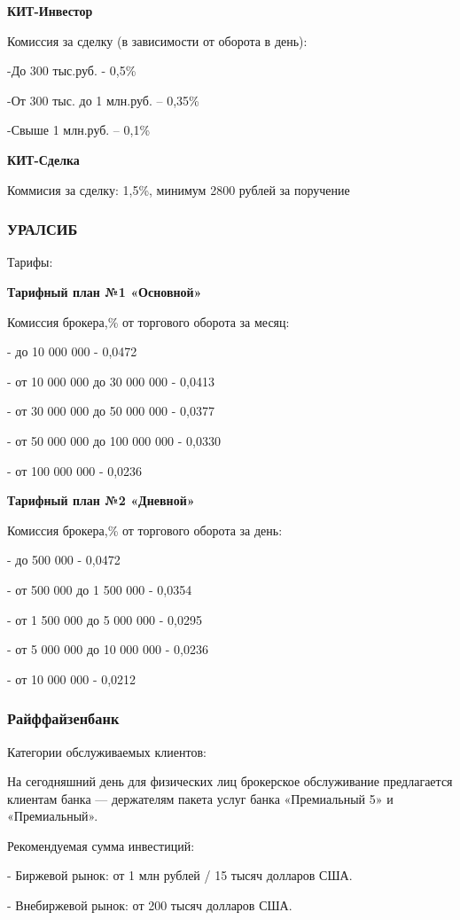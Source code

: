 \textbf{КИТ-Инвестор}

Комиссия за сделку (в зависимости от оборота в день):

-До 300 тыс.руб. - 0,5\%

-От 300 тыс. до 1 млн.руб. – 0,35\%

-Свыше 1 млн.руб. – 0,1\%

\textbf{КИТ-Сделка}

Коммисия за сделку: 1,5\%, минимум 2800 рублей за поручение

\subsubsection{УРАЛСИБ}

Тарифы:

\textbf{Тарифный план №1 «Основной»}

Комиссия брокера,\% от торгового оборота за месяц:

- до 10 000 000 - 0,0472

- от 10 000 000 до 30 000 000 - 0,0413

- от 30 000 000 до 50 000 000 - 0,0377

- от 50 000 000 до 100 000 000 - 0,0330

- от 100 000 000 - 0,0236

\textbf{Тарифный план №2 «Дневной»}

Комиссия брокера,\% от торгового оборота за день:

- до 500 000 - 0,0472

- от 500 000 до 1 500 000 - 0,0354

- от 1 500 000 до 5 000 000 - 0,0295

- от 5 000 000 до 10 000 000 - 0,0236

- от 10 000 000 - 0,0212

\subsubsection{Райффайзенбанк}

Категории обслуживаемых клиентов:

На сегодняшний день для физических лиц брокерское обслуживание предлагается клиентам банка — держателям пакета услуг банка «Премиальный 5» и «Премиальный».

Рекомендуемая сумма инвестиций:

- Биржевой рынок: от 1 млн рублей / 15 тысяч долларов США.

- Внебиржевой рынок: от 200 тысяч долларов США.

